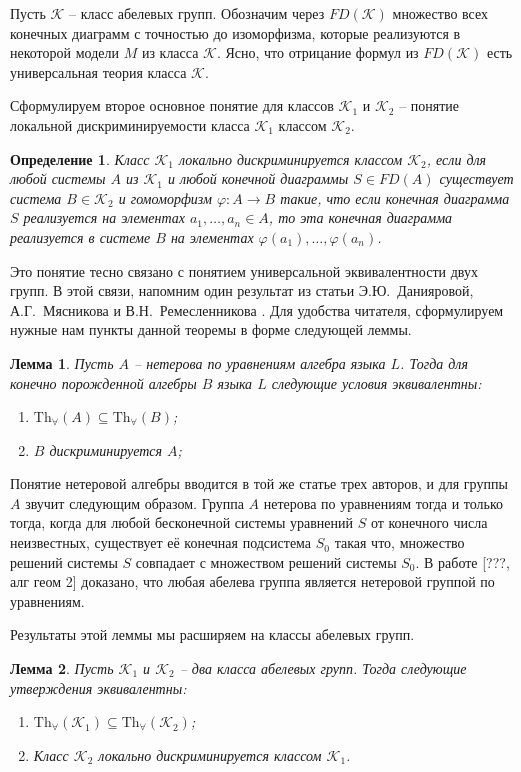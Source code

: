 \documentclass[a4paper,11pt,twoside]{article}
\newtheorem{lemma}{Лемма}[section]
\newtheorem{definition}{Определение}[section]
\def\K{{\mathcal{K}}}
\def\Tha{{\mathrm{Th}_\forall}}
\begin{document}
Пусть $\K$ -- класс абелевых групп. Обозначим через $FD(\K)$ множество всех конечных диаграмм с точностью до изоморфизма, которые реализуются в некоторой модели $M$ из класса $\K$. Ясно, что отрицание формул из $FD(\K)$ есть универсальная теория класса $\K$.

Сформулируем второе основное понятие для классов $\K_1$ и $\K_2$ -- понятие локальной дискриминируемости класса $\K_1$ классом $\K_2$.
\begin{definition}
Класс $\K_1$ локально дискриминируется классом $\K_2$, если для любой системы $A$ из $\K_1$ и любой конечной диаграммы $S \in FD(A)$ существует система $B \in \K_2$ и гомоморфизм $\varphi: A \rightarrow B$ такие, что если конечная диаграмма $S$ реализуется на элементах $a_1, \ldots, a_n \in A$, то эта конечная диаграмма реализуется в системе $B$ на элементах $\varphi(a_1), \ldots, \varphi(a_n)$.
\end{definition}

Это понятие тесно связано с понятием универсальной эквивалентности двух групп. В этой связи, напомним один результат из статьи Э.Ю.~Данияровой, А.Г.~Мясникова и В.Н.~Ремесленникова \cite{DMR1}. Для удобства читателя, сформулируем нужные нам пункты данной теоремы в форме следующей леммы.

\begin{lemma}\label{lemma:UnivEquiv}
Пусть $A$ -- нетерова по уравнениям алгебра языка $L$. Тогда для конечно порожденной алгебры $B$ языка $L$ следующие условия эквивалентны:
\begin{enumerate}
\item $\mathrm{Th}_{\forall}(A) \subseteq \mathrm{Th}_{\forall}(B)$;
\item $B$ дискриминируется $A$;
\end{enumerate}
\end{lemma}

Понятие нетеровой алгебры вводится в той же статье трех авторов, и для группы $A$ звучит следующим образом. Группа $A$ нетерова по уравнениям тогда и только тогда, когда для любой бесконечной системы уравнений $S$ от конечного числа неизвестных, существует её конечная подсистема $S_0$ такая что, множество решений системы $S$ совпадает с множеством решений системы $S_0$. В работе [???, алг геом 2] доказано, что любая абелева группа является нетеровой группой по уравнениям.


Результаты этой леммы мы расширяем на классы абелевых групп.

\begin{lemma}\label{lemma:UnivEquivForClass}
Пусть $\K_1$ и $\K_2$ -- два класса абелевых групп. Тогда следующие утверждения эквивалентны:
\begin{enumerate}
\item $\Tha(\K_1) \subseteq \Tha(\K_2)$;
\item Класс $\K_2$ локально дискриминируется классом $\K_1$.
\end{enumerate}
\end{lemma}
\end{document}
